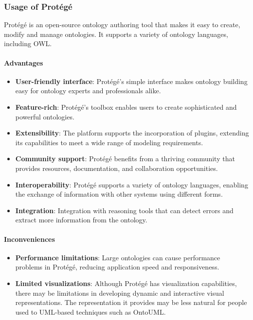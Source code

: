     \subsubsection{Usage of Protégé}
    Protégé is an open-source ontology authoring tool that makes it easy to create, modify and manage ontologies. It supports a variety of ontology languages, including OWL.
    
    \paragraph{Advantages}
    \begin{itemize}
        \item \textbf{User-friendly interface}: Protégé's simple interface makes ontology building easy for ontology experts and professionals alike.
        \item \textbf{Feature-rich}: Protégé's toolbox enables users to create sophisticated and powerful ontologies.
        \item \textbf{Extensibility}: The platform supports the incorporation of plugins, extending its capabilities to meet a wide range of modeling requirements.
        \item \textbf{Community support}: Protégé benefits from a thriving community that provides resources, documentation, and collaboration opportunities.
        \item \textbf{Interoperability}: Protégé supports a variety of ontology languages, enabling the exchange of information with other systems using different forms.
        \item \textbf{Integration}:  Integration with reasoning tools that can detect errors and extract more information from the ontology.
    \end{itemize}
    
    \paragraph{Inconveniences}
    \begin{itemize}
        \item \textbf{Performance limitations}: Large ontologies can cause performance problems in Protégé, reducing application speed and responsiveness.
        \item \textbf{Limited visualizations}: Although Protégé has visualization capabilities, there may be limitations in developing dynamic and interactive visual representations. The representation it provides may be less natural for people used to UML-based techniques such as OntoUML.
    \end{itemize}
    


